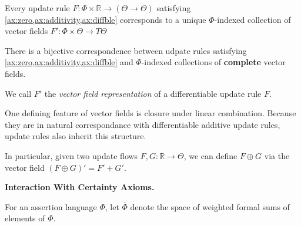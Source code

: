 \documentclass{article}
\newcommand{\ext}[1]{\overline #1} %
\begin{document}
\begin{theorem}
    Every update rule $F : \Phi \times \mathbb R \to (\Theta  \to \Theta)$
    satisfying \cref{ax:zero,ax:additivity,ax:diffble} corresponds to a unique
    $\Phi$-indexed collection of vector fields
        $F' : \Phi \times \Theta \to T\Theta$
\end{theorem}
\begin{coro}\label{thm:vecrep}
    There is a bijective correspondence between udpate rules satisfying \cref{ax:zero,ax:additivity,ax:diffble} and $\Phi$-indexed collections of \textbf{complete} vector fields.
\end{coro}

We call $F'$ the \emph{vector field representation} of a differentiable update rule $F$.

One defining feature of vector fields is closure under linear
    combination.
Because they are in natural correspondance with differentiable additive update rules, update rules also inherit this structure.

In particular, given two update flows $F, G : \mathbb R \to \Theta$, we can define
$F \oplus G$ via the vector field $(F \oplus G)' = F' + G'$.

\begin{wip}
    \textbf{Interaction With Certainty Axioms.}

\end{wip}

\begin{defn}
    For an assertion language $\Phi$, let $\ext\Phi$ denote
    the space of weighted formal sums of elements of $\Phi$.
\end{defn}
\end{document}
